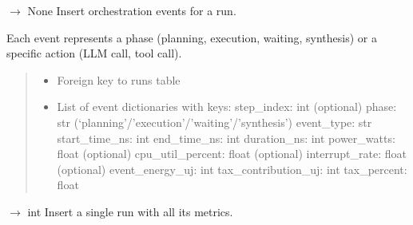 \documentclass[letterpaper,10pt,english]{sphinxmanual}
\begin{document}
\begin{fulllineitems}
\begin{fulllineitems}
\label{\detokenize{core.database.base:core.database.base.DatabaseInterface.insert_orchestration_events}}
\pysigstartsignatures
\pysiglinewithargsret
{}
{\sphinxparamcomma {}}
{{ $\rightarrow$ None}}
\pysigstopsignatures
\sphinxAtStartPar
Insert orchestration events for a run.

\sphinxAtStartPar
Each event represents a phase (planning, execution, waiting, synthesis)
or a specific action (LLM call, tool call).
\begin{quote}\begin{description}
\begin{itemize}
\item {} 
\sphinxAtStartPar
{} \textendash{} Foreign key to runs table

\item {} 
\sphinxAtStartPar
{} \textendash{} List of event dictionaries with keys:
\sphinxhyphen{} step\_index: int (optional)
\sphinxhyphen{} phase: str (‘planning’/’execution’/’waiting’/’synthesis’)
\sphinxhyphen{} event\_type: str
\sphinxhyphen{} start\_time\_ns: int
\sphinxhyphen{} end\_time\_ns: int
\sphinxhyphen{} duration\_ns: int
\sphinxhyphen{} power\_watts: float (optional)
\sphinxhyphen{} cpu\_util\_percent: float (optional)
\sphinxhyphen{} interrupt\_rate: float (optional)
\sphinxhyphen{} event\_energy\_uj: int
\sphinxhyphen{} tax\_contribution\_uj: int
\sphinxhyphen{} tax\_percent: float

\end{itemize}

\end{description}\end{quote}

\end{fulllineitems}


\begin{fulllineitems}
\label{\detokenize{core.database.base:core.database.base.DatabaseInterface.insert_run}}
\pysigstartsignatures
\pysiglinewithargsret
{}
{}
{{ $\rightarrow$ int}}
\pysigstopsignatures
\sphinxAtStartPar
Insert a single run with all its metrics.


\end{fulllineitems}
\end{fulllineitems}
\end{document}
